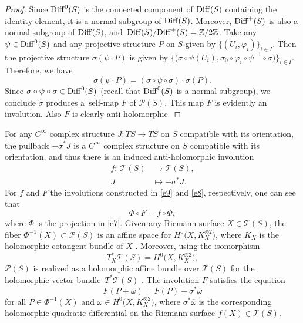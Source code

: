 \documentclass[10pt,a4paper]{amsart}
\numberwithin{equation}{section}
\begin{document}
\begin{proof}
Since ${\rm Diff}^0(S)$ is the connected component of ${\rm Diff}(S)$ containing the identity element, it is a normal subgroup
of ${\rm Diff}(S)$. Moreover, ${\rm Diff}^+(S)$ is also a normal subgroup of ${\rm Diff}(S)$, and~${\rm Diff}(S)/{\rm
Diff}^+(S) = {\mathbb Z}/2{\mathbb Z}$. Take any $\psi \in {\rm Diff}^0(S)$ and any projective structure $P$ on
$S$ given by $\{(U_i, \varphi_i)\}_{i\in I}$. Then the projective structure $\widetilde{\sigma}(\psi\cdot P)$ is given
by $\big\{\bigl(\sigma\circ \psi(U_i), \sigma_0\circ\varphi_i\circ\psi^{-1}\circ\sigma\bigr)\big\}_{i\in I}$. Therefore, we have
\[
\widetilde{\sigma}(\psi\cdot P) = (\sigma\circ\psi\circ\sigma)\cdot\widetilde{\sigma}(P).
\]
Since $\sigma\circ\psi\circ\sigma \in {\rm Diff}^0(S)$ (recall that ${\rm Diff}^0(S)$ is a normal subgroup), we
conclude $\widetilde{\sigma}$ produces a~self-map $F$ of ${\mathcal P}(S)$. This map $F$ is evidently an involution.
Also $F$ is clearly anti-holomorphic.
\end{proof}

For any $C^\infty$ complex structure $J\colon TS \longrightarrow TS$ on $S$ compatible with its orientation,
the pullback $-\sigma^*J$
is a $C^\infty$ complex structure on $S$ compatible with its orientation, and thus there is an induced anti-holomorphic involution
\begin{align}
f\colon\ {\mathcal T}(S) &\longrightarrow {\mathcal T}(S),\nonumber \\
J &\longmapsto -\sigma^*J. \label{e9}
\end{align}
For $f$ and $F$ the involutions constructed in \eqref{e9} and \eqref{e8}, respectively, one can see that
\begin{equation}\label{ec}
\Phi\circ F = f\circ\Phi,
\end{equation}
where $\Phi$ is the projection in \eqref{e7}. Given any Riemann surface $X \!\!\in\! {\mathcal T}(S)$, the fiber
${\Phi^{-1}(X)\! \subset \!{\mathcal P}(S)}$ is an affine space for
$H^0\bigl(X, K^{\otimes 2}_X\bigr)$, where $K_X$ is the holomorphic cotangent bundle
of $X$ \cite{ Gu, Hu}. Moreover, using the isomorphism
\[
T^*_X {\mathcal T}(S) = H^0\bigl(X, K^{\otimes 2}_X\bigr),
\]
${\mathcal P}(S)$ is realized as a holomorphic affine bundle over
${\mathcal T}(S)$ for the holomorphic vector bundle~$T^*{\mathcal T}(S)$ \cite{Gu,Hu}.
The involution $F$ satisfies the equation
\begin{equation}\label{fe}
F(P+\omega) = F(P)+ \sigma^*\overline{\omega}
\end{equation}
for all $P \in \Phi^{-1}(X)$ and $\omega \in H^0\bigl(X, K^{\otimes 2}_X\bigr)$, where
$\sigma^*\overline{\omega}$ is the corresponding holomorphic quadratic differential on the
Riemann surface $f(X) \in {\mathcal T}(S)$.
\end{document}
